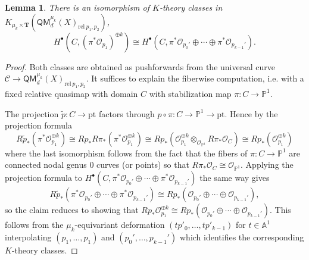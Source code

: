 \documentclass[reqno]{amsart}
\numberwithin{equation}{section}
\numberwithin{equation}{section}
\numberwithin{equation}{section}
\newtheorem{lemma}[thm]{Lemma}
\theoremstyle{definition}
\theoremstyle{remark}
\theoremstyle{remark}
\begin{document}
\begin{lemma}\label{lem:deformation-to-equator}
     There is an isomorphism of $K$-theory classes in $K_{\mu_k \times \mathbf{T}}(\mathsf{QM}_d^{\mu_k}(X)_{\mathrm{rel} \  p_1, p_2})$,
    \begin{equation}
        H^\bullet \left(C, \left(\pi^* \mathcal{O}_{p_1} \right)^{\oplus k} \right) \cong H^\bullet \left( C, \pi^* \mathcal{O}_{p_0'} \oplus \cdots \oplus \pi^* \mathcal{O}_{p_{k-1}'} \right).
    \end{equation}
\end{lemma}
\begin{proof}
    Both classes are obtained as pushforwards from the universal curve $\mathcal{C} \to \mathsf{QM}_d^{\mu_k}(X)_{\mathrm{rel} \  p_1, p_2}$. It suffices to explain the fiberwise computation, i.e. with a fixed relative quasimap with domain $C$ with stabilization map $\pi: C \to \mathbb{P}^1$.

    The projection $\tilde{p}: C \to \mathrm{pt}$ factors through $ p \circ \pi : C \to \mathbb{P}^1 \to \mathrm{pt}$. Hence by the projection formula
    \begin{equation}
        R\widetilde{p}_* (\pi^*\mathcal{O}_{p_1}^{\oplus k} ) \cong Rp_* R\pi_* (\pi^* \mathcal{O}_{p_1}^{\oplus k}) \cong Rp_* \left( \mathcal{O}_{p_1}^{\oplus k } \otimes_{\mathcal{O}_{\mathbb{P}^1}} R\pi_* \mathcal{O}_{C} \right) \cong Rp_* (\mathcal{O}_{p_1}^{\oplus k} )
    \end{equation}
    where the last isomorphism follows from the fact that the fibers of $\pi: C \to \mathbb{P}^1$ are connected nodal genus 0 curves (or points) so that $R\pi_* \mathcal{O}_{C} \cong \mathcal{O}_{\mathbb{P}^1}$.
    Applying the projection formula to $H^\bullet \left( C, \pi^* \mathcal{O}_{p_0'} \oplus \cdots \oplus \pi^* \mathcal{O}_{p_{k-1}'} \right)$ the same way gives
    \begin{equation}
        R\widetilde{p}_* (\pi^* \mathcal{O}_{p_0'} \oplus \cdots \oplus \pi^* \mathcal{O}_{p_{k-1}'} ) \cong Rp_* \left( \mathcal{O}_{p_0'} \oplus \cdots \oplus \mathcal{O}_{p_{k-1}'}\right), 
    \end{equation}
    so the claim reduces to showing that $Rp_* \mathcal{O}_{p_1}^{\oplus k} \cong Rp_* \left( \mathcal{O}_{p_0'} \oplus \cdots \oplus \mathcal{O}_{p_{k-1}'} \right)$. This follows from the $\mu_k$-equivariant deformation $(t p'_0, \dots, t p'_{k-1})$ for $t \in \mathbb{A}^1$ interpolating $(p_1, \dots, p_1)$ and $(p_0', \dots, p_{k-1}')$ which identifies the corresponding $K$-theory classes.
\end{proof}
\end{document}
